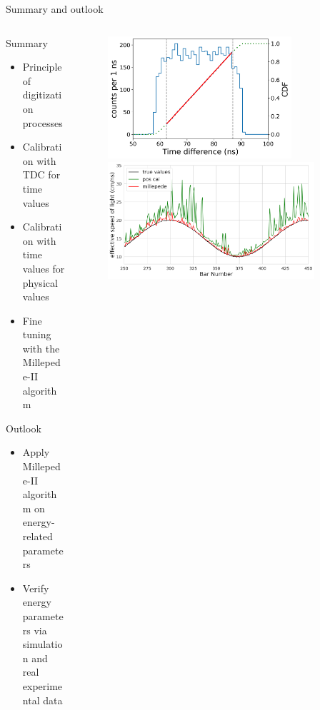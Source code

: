 \documentclass{ikpKoeln}
\begin{document}
\begin{frame}[t]{Summary and outlook}
	\vspace{-1em}
	\begin{columns}[c]
		\begin{column}{0.45 \textwidth}
			\begin{block} {Summary}
				\begin{itemize}
					\setlength\itemsep{0.5em}
					\item Principle of digitization processes
					\item Calibration with TDC for time values
					\item Calibration with time values for physical values
					\item Fine tuning with the Millepede-II algorithm
				\end{itemize}
			\end{block}
			\begin{exampleblock} {Outlook}
				\begin{itemize}
					\setlength\itemsep{0.5em}
					\item Apply Millepede-II algorithm on energy-related parameters
					\item Verify energy parameters via simulation and real experimental data
				\end{itemize}
			\end{exampleblock}
		\end{column}
		\begin{column}{0.45 \textwidth}
			\begin{figure}
				\includegraphics[width = 0.8\textwidth]{DPG2025/TimeDifference_2.png}
				\includegraphics[width = 0.9\textwidth]{DPG2025/sim_comp_c_wide.png}
			\end{figure}
		\end{column}
	\end{columns}
\end{frame}
\end{document}
